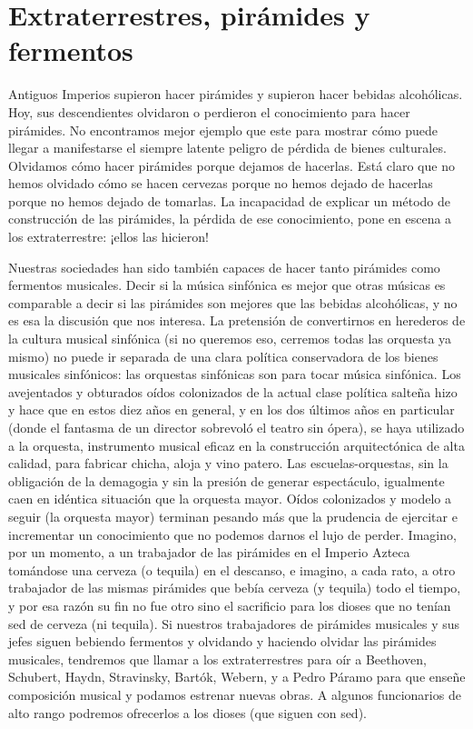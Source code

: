 \section{Extraterrestres, pirámides y fermentos}

Antiguos Imperios supieron hacer pirámides y supieron hacer bebidas alcohólicas. Hoy, sus descendientes olvidaron o perdieron el conocimiento para hacer pirámides. No encontramos mejor ejemplo que este para mostrar cómo puede llegar a manifestarse el siempre latente peligro de pérdida de bienes culturales. Olvidamos cómo hacer pirámides porque dejamos de hacerlas. Está claro que no hemos olvidado cómo se hacen cervezas porque no hemos dejado de hacerlas porque no hemos dejado de tomarlas. La incapacidad de explicar un método de construcción de las pirámides, la pérdida de ese conocimiento, pone en escena a los extraterrestre: ¡ellos las hicieron!

Nuestras sociedades han sido también capaces de hacer tanto pirámides como fermentos musicales. Decir si la música sinfónica es mejor que otras músicas es comparable a decir si las pirámides son mejores que las bebidas alcohólicas, y no es esa la discusión que nos interesa. La pretensión de convertirnos en herederos de la cultura musical sinfónica (si no queremos eso, cerremos todas las orquesta ya mismo) no puede ir separada de una clara política conservadora de los bienes musicales sinfónicos: las orquestas sinfónicas son para tocar música sinfónica. Los avejentados y obturados oídos colonizados de la actual clase política salteña hizo y hace que en  estos diez años en general, y en los dos últimos años en particular (donde el fantasma de un director sobrevoló el teatro sin ópera), se haya utilizado a la orquesta, instrumento musical eficaz en la construcción arquitectónica de alta calidad, para fabricar chicha, aloja y vino patero. Las escuelas-orquestas, sin la obligación de la demagogia y sin la presión de generar espectáculo, igualmente caen en idéntica situación que la orquesta mayor. Oídos colonizados y modelo a seguir (la orquesta mayor) terminan pesando más que la prudencia de ejercitar e incrementar un conocimiento que no podemos darnos el lujo de perder. Imagino, por un momento, a un trabajador de las pirámides en el Imperio Azteca tomándose una cerveza (o tequila) en el descanso, e imagino, a cada rato, a otro trabajador de las mismas pirámides que bebía cerveza (y tequila) todo el tiempo, y por esa razón su fin no fue otro sino el sacrificio para los dioses que no tenían sed de cerveza (ni tequila). Si nuestros trabajadores de pirámides musicales y sus jefes siguen bebiendo  fermentos y olvidando y haciendo olvidar las pirámides musicales, tendremos que llamar a los extraterrestres para oír a Beethoven, Schubert, Haydn, Stravinsky, Bartók, Webern, y a Pedro Páramo para que enseñe composición musical y podamos  estrenar nuevas obras. A algunos funcionarios de alto rango podremos ofrecerlos a los dioses (que siguen con sed).